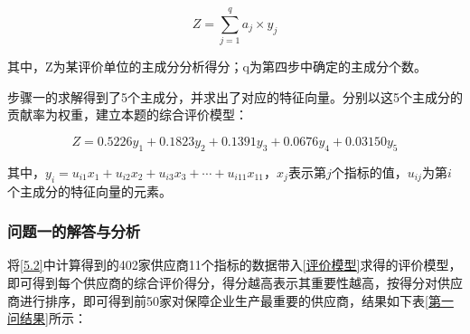 \documentclass[withoutpreface,bwprint]{cumcmthesis} %
\begin{document}
\begin{equation}
    Z=\sum_{j=1}^{q} a_{j} \times y_{j}
\end{equation}

其中，Z为某评价单位的主成分分析得分；q为第四步中确定的主成分个数。

步骤一的求解得到了5个主成分，并求出了对应的特征向量。分别以这5个主成分的贡献率为权重，建立本题的综合评价模型：

\begin{equation}
    Z=0.5226y_1+0.1823y_2+0.1391y_3+0.0676y_4+0.03150y_5
    \label{评价模型}
\end{equation}

其中，$y_{i}=u_{i 1} x_{1}+u_{i 2} x_{2}+u_{i 3} x_{3}+\cdots+u_{i 11} x_{11}$，$x_j$表示第$j$个指标的值，$u_{i j}$为第$i$个主成分的特征向量的元素。

\subsubsection{问题一的解答与分析}

将\ref{5.2}中计算得到的402家供应商11个指标的数据带入\ref{评价模型}求得的评价模型，即可得到每个供应商的综合评价得分，得分越高表示其重要性越高，按得分对供应商进行排序，即可得到前50家对保障企业生产最重要的供应商，结果如下表\ref{第一问结果}所示：
\end{document}
